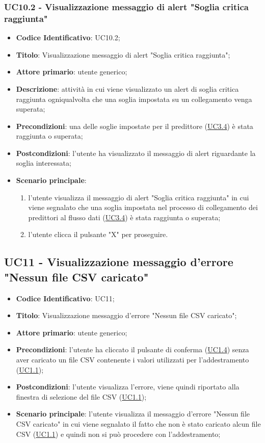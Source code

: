	\subsubsection{UC10.2 - Visualizzazione messaggio di alert "Soglia critica raggiunta"}
		\begin{itemize}
			\item\textbf{Codice Identificativo}: UC10.2;
			\item\textbf{Titolo}: Visualizzazione messaggio di alert "Soglia critica raggiunta";
			\item\textbf{Attore primario}: utente generico;
			\item\textbf{Descrizione}: attività in cui viene visualizzato un alert di soglia critica raggiunta ogniqualvolta che una soglia impostata su un collegamento venga superata;
			\item\textbf{Precondizioni}: una delle soglie impostate per il predittore (\hyperref[par:UC3.4]{UC3.4}) è stata raggiunta o superata;
			\item\textbf{Postcondizioni}: l'utente ha visualizzato il messaggio di alert riguardante la soglia interessata;
			\item\textbf{Scenario principale}:
				\begin{enumerate}
					\item l'utente visualizza il messaggio di alert "Soglia critica raggiunta" in cui viene segnalato che una soglia impostata nel processo di collegamento dei predittori al flusso dati (\hyperref[par:UC3.4]{UC3.4}) è stata raggiunta o superata;
					\item l'utente clicca il pulsante "X" per proseguire.		
				\end{enumerate}		
		\end{itemize}
	
	\label{par:UC11}
	\subsection{UC11 - Visualizzazione messaggio d'errore "Nessun file CSV caricato"}
		\begin{itemize}
			\item\textbf{Codice Identificativo}: UC11;
			\item\textbf{Titolo}: Visualizzazione messaggio d'errore "Nessun file CSV caricato";
			\item\textbf{Attore primario}: utente generico;
			\item\textbf{Precondizioni}: l'utente ha cliccato il pulsante di conferma (\hyperref[par:UC1.4]{UC1.4}) senza aver caricato un file CSV contenente i valori utilizzati per l'addestramento (\hyperref[par:UC1.1]{UC1.1});
			\item\textbf{Postcondizioni}: l'utente visualizza l'errore, viene quindi riportato alla finestra di selezione del file CSV (\hyperref[par:UC1.1]{UC1.1});
			\item\textbf{Scenario principale}: l'utente visualizza il messaggio d'errore "Nessun file CSV caricato" in cui viene segnalato il fatto che non è stato caricato alcun file CSV (\hyperref[par:UC1.1]{UC1.1}) e quindi non si può procedere con l'addestramento; 		
		\end{itemize}
		

